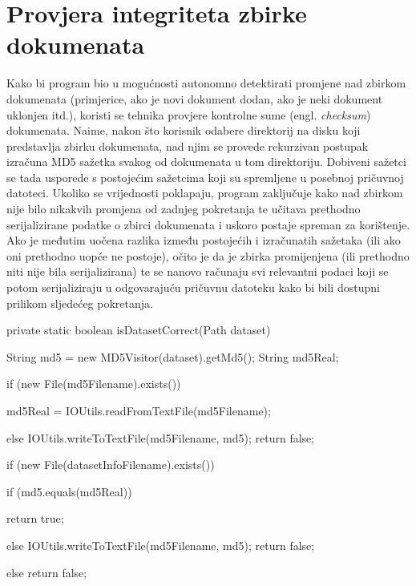 \documentclass[times, utf8, zavrsni, numeric]{fer}
\begin{document}
\section{Provjera integriteta zbirke dokumenata}
Kako bi program bio u mogućnosti autonomno detektirati promjene nad zbirkom dokumenata (primjerice, ako je novi dokument dodan, ako je neki dokument uklonjen itd.), koristi se tehnika provjere kontrolne sume (engl. \textit{checksum}) dokumenata. Naime, nakon što korisnik odabere direktorij na disku koji predstavlja zbirku dokumenata, nad njim se provede rekurzivan postupak izračuna MD5 sažetka svakog od dokumenata u tom direktoriju. Dobiveni sažetci se tada usporede s postojećim sažetcima koji su spremljene u posebnoj pričuvnoj datoteci. Ukoliko se vrijednosti poklapaju, program zaključuje kako nad zbirkom nije bilo nikakvih promjena od zadnjeg pokretanja te učitava prethodno serijalizirane podatke o zbirci dokumenata i uskoro postaje spreman za korištenje. Ako je međutim uočena razlika između postojećih i izračunatih sažetaka (ili ako oni prethodno uopće ne postoje), očito je da je zbirka promijenjena (ili prethodno niti nije bila serijalizirana) te se nanovo računaju svi relevantni podaci koji se potom serijaliziraju u odgovarajuću pričuvnu datoteku kako bi bili dostupni prilikom sljedećeg pokretanja.

\begin{code}[caption={Isječak programskog koda za provjeru ispravnosti zbirke},captionpos=b]
private static boolean isDatasetCorrect(Path dataset) {
    String md5 = new MD5Visitor(dataset).getMd5();
    String md5Real;

    if (new File(md5Filename).exists()) {
        md5Real = IOUtils.readFromTextFile(md5Filename);

    } else {
        IOUtils.writeToTextFile(md5Filename, md5);
        return false;
    }

    if (new File(datasetInfoFilename).exists()) {
        if (md5.equals(md5Real)) {
            return true;

        } else {
            IOUtils.writeToTextFile(md5Filename, md5);
            return false;
        }

    } else {
        return false;
    }
}
\end{code}
\end{document}
